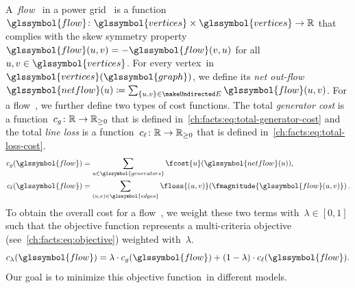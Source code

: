 A~\emph{flow}~ in a power grid~ is a
function~$\glssymbol{flow} \colon
\glssymbol{vertices} \times \glssymbol{vertices} \to \reals$ that complies with the skew symmetry
property~$\glssymbol{flow}(\vertexa,\vertexb) = -\glssymbol{flow}(\vertexb,\vertexa)$ for
all~$\vertexa, \vertexb \in \glssymbol{vertices}$.
% 
For every vertex~\vertexa in~$\glssymbol{vertices}(\glssymbol{graph})$, we
define its \emph{net out-flow} $\glssymbol{netflow}(\vertexa) \coloneq
\sum_{\{\vertexa,\vertexb\}
\in\undirectededges}
\glssymbol{flow}(\vertexa,\vertexb)$.
% 
For a flow~, we further define two types of cost functions. The total
\emph{generator cost} is a function~$c_g\colon\mathbb{R}\to\mathbb{R}_{\ge0}$ that is
defined in~\cref{ch:facts:eq:total-generator-cost} and the total \emph{line
loss} is a function~$c_\ell\colon\mathbb{R}\to\mathbb{R}_{\ge0}$ that is defined
in~\cref{ch:facts:eq:total-loss-cost}.
% 
\begin{align}
    \gencost(\glssymbol{flow}) 
    &= 
    \sum_{\vertexa \in \glssymbol{generators}} \fcost{\vertexa} ( \glssymbol{netflow}(\vertexa) ),
    \label{ch:facts:eq:total-generator-cost}
    \\
    \losscost(\glssymbol{flow}) 
    &= 
    \sum_{(\vertexa,\vertexb) \in \glssymbol{edges}} 
    \floss{(\vertexa,\vertexb)}(\fmagnitude{\glssymbol{flow}(\vertexa,\vertexb)})\,.
    \label{ch:facts:eq:total-loss-cost}
\end{align}
% 
To obtain the overall cost for a flow~, we weight these two
terms with~$\lambda\in [0,1]$ such that the objective function represents a
multi-criteria objective (see~\cref{ch:facts:eq:objective}) weighted
with~$\lambda$.
% 
\begin{equation}
    \totalgenlosscost(\glssymbol{flow}) = \lambda \cdot \gencost(\glssymbol{flow}) + (1-\lambda) \cdot
    \losscost(\glssymbol{flow}).
    \label{ch:facts:eq:objective}
\end{equation}
% 
Our goal is to minimize this objective function~\totalgenlosscost in different
models.
%
